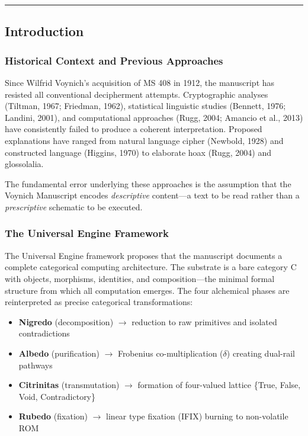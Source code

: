 \documentclass[12pt,a4paper]{article}
\begin{document}
\begin{center}
\rule{0.5\textwidth}{0.4pt}
\end{center}

\subsection{Introduction}

\subsubsection{Historical Context and Previous Approaches}

Since Wilfrid Voynich's acquisition of MS 408 in 1912, the manuscript has resisted all conventional decipherment attempts. Cryptographic analyses (Tiltman, 1967; Friedman, 1962), statistical linguistic studies (Bennett, 1976; Landini, 2001), and computational approaches (Rugg, 2004; Amancio et al., 2013) have consistently failed to produce a coherent interpretation. Proposed explanations have ranged from natural language cipher (Newbold, 1928) and constructed language (Higgins, 1970) to elaborate hoax (Rugg, 2004) and glossolalia.

The fundamental error underlying these approaches is the assumption that the Voynich Manuscript encodes \emph{descriptive} content---a text to be read rather than a \emph{prescriptive} schematic to be executed.

\subsubsection{The Universal Engine Framework}

The Universal Engine framework proposes that the manuscript documents a complete categorical computing architecture. The substrate is a bare category C with objects, morphisms, identities, and composition---the minimal formal structure from which all computation emerges. The four alchemical phases are reinterpreted as precise categorical transformations:

\begin{itemize}
    \item \textbf{Nigredo} (decomposition) $\rightarrow$ reduction to raw primitives and isolated contradictions
    \item \textbf{Albedo} (purification) $\rightarrow$ Frobenius co-multiplication ($\delta$) creating dual-rail pathways
    \item \textbf{Citrinitas} (transmutation) $\rightarrow$ formation of four-valued lattice \{True, False, Void, Contradictory\}
    \item \textbf{Rubedo} (fixation) $\rightarrow$ linear type fixation (IFIX) burning to non-volatile ROM
\end{itemize}
\end{document}
